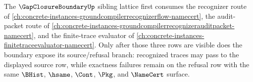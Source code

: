 The $\GapClosureBoundaryUp$ sibling lattice first consumes the recognizer route of \autoref{ch:concrete-instances-groundcompilerrecognizerflow-namecert}, the audit-packet route of \autoref{ch:concrete-instances-groundcompilerrecognizerauditpacket-namecert}, and the finite-trace evaluator of \autoref{ch:concrete-instances-finitetraceevaluator-namecert}. Only after those three rows are visible does the boundary expose its source/refusal branch: recognized traces may pass to the displayed source row, while exactness failures remain on the refusal row with the same $\BHist$, $\hsame$, $\Cont$, $\Pkg$, and $\NameCert$ surface.

